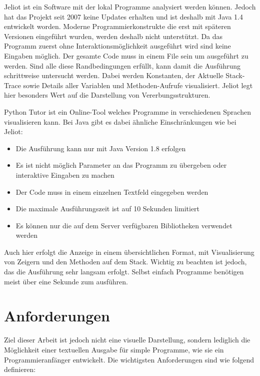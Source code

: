 Jeliot ist ein Software mit der lokal Programme analysiert werden können. Jedoch hat das Projekt seit 2007 keine Updates erhalten und ist deshalb mit Java 1.4 entwickelt worden. Moderne Programmierkonstrukte die erst mit späteren Versionen eingeführt wurden, werden deshalb nicht unterstützt. Da das Programm zuerst ohne Interaktionsmöglichkeit ausgeführt wird sind keine Eingaben möglich. Der gesamte Code muss in einem File sein um ausgeführt zu werden. Sind alle diese Randbedingungen erfüllt, kann damit die Ausführung schrittweise untersucht werden. Dabei werden Konstanten, der Aktuelle Stack-Trace sowie Details aller Variablen und Methoden-Aufrufe visualisiert. Jeliot legt hier besonders Wert auf die Darstellung von Vererbungsstrukturen.


Python Tutor ist ein Online-Tool welches Programme in verschiedenen Sprachen visualisieren kann. Bei Java gibt es dabei ähnliche Einschränkungen wie bei Jeliot:
\begin{itemize}
	\item Die Ausführung kann nur mit Java Version 1.8 erfolgen
	\item Es ist nicht möglich Parameter an das Programm zu übergeben oder interaktive Eingaben zu machen
	\item Der Code muss in einem einzelnen Textfeld eingegeben werden
	\item Die maximale Ausführungszeit ist auf 10 Sekunden limitiert
	\item Es können nur die auf dem Server verfügbaren Bibliotheken verwendet werden
\end{itemize}

Auch hier erfolgt die Anzeige in einem übersichtlichen Format, mit Visualisierung von Zeigern und den Methoden auf dem Stack. Wichtig zu beachten ist jedoch, das die Ausführung sehr langsam erfolgt. Selbst einfach Programme benötigen meist über eine Sekunde zum ausführen.


\section{Anforderungen} 
\label{sec:anforderungen}

Ziel dieser Arbeit ist jedoch nicht eine visuelle Darstellung, sondern lediglich die Möglichkeit einer textuellen Ausgabe für simple Programme, wie sie ein Programmieranfänger entwickelt. Die wichtigsten Anforderungen sind wie folgend definieren:

